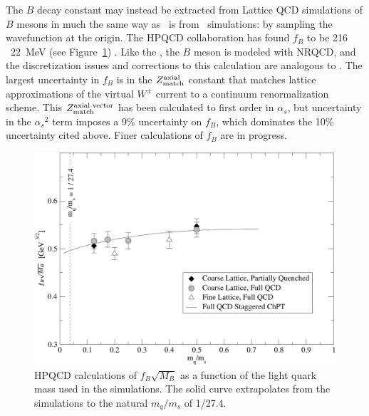 \documentclass{cornell}
\begin{document}
The $B$ decay constant may instead be extracted from Lattice QCD
simulations of $B$ mesons in much the same way as \gee\ is from \ups\
simulations: by sampling the wavefunction at the origin.  The HPQCD
collaboration has found $f_B$ to be 216 \PM\ 22~MeV (see
Figure~\ref{fbresults}) \cite{fb}.  Like the \ups, the $B$ meson is
modeled with NRQCD, and the discretization issues and corrections to
this calculation are analogous to \gee.  The largest uncertainty in
$f_B$ is in the $Z_{\mbox{\scriptsize match}}^{\mbox{\scriptsize axial}}$ constant that
matches lattice approximations of the virtual $W^\pm$ current to a
continuum renormalization scheme.  This $Z_{\mbox{\scriptsize match}}^{\mbox{\scriptsize axial
vector}}$ has been calculated to first order in $\alpha_s$, but
uncertainty in the ${\alpha_s}^2$ term imposes a 9\% uncertainty on
$f_B$, which dominates the 10\% uncertainty cited above.  Finer
calculations of $f_B$ are in progress.

\begin{figure}[p]
  \begin{center}
    \includegraphics[width=\linewidth]{plots/fbresults}
  \end{center}
  \caption[Extrapolation of Lattice QCD results to physical light
  quark masses]{\label{fbresults} HPQCD calculations of $f_B \sqrt{M_B}$ as
  a function of the light quark mass used in the simulations.  The
  solid curve extrapolates from the simulations to the natural
  $m_q/m_s$ of 1/27.4.}
\end{figure}
\end{document}
